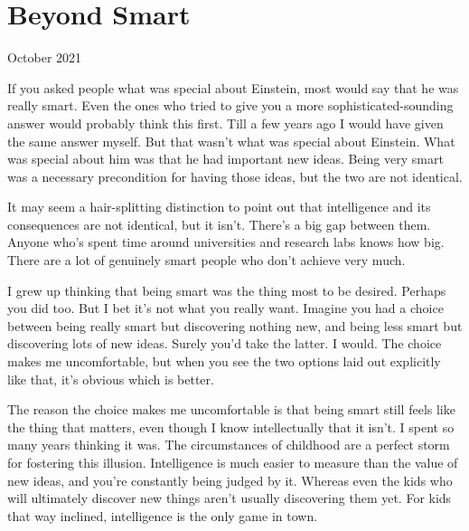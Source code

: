 \chapter{Beyond Smart}

October 2021

If you asked people what was special about Einstein, most would say that
he was really smart. Even the ones who tried to give you a more
sophisticated-sounding answer would probably think this first. Till a
few years ago I would have given the same answer myself. But that wasn't
what was special about Einstein. What was special about him was that he
had important new ideas. Being very smart was a necessary precondition
for having those ideas, but the two are not identical.

It may seem a hair-splitting distinction to point out that intelligence
and its consequences are not identical, but it isn't. There's a big gap
between them. Anyone who's spent time around universities and research
labs knows how big. There are a lot of genuinely smart people who don't
achieve very much.

I grew up thinking that being smart was the thing most to be desired.
Perhaps you did too. But I bet it's not what you really want. Imagine
you had a choice between being really smart but discovering nothing new,
and being less smart but discovering lots of new ideas. Surely you'd
take the latter. I would. The choice makes me uncomfortable, but when
you see the two options laid out explicitly like that, it's obvious
which is better.

The reason the choice makes me uncomfortable is that being smart still
feels like the thing that matters, even though I know intellectually
that it isn't. I spent so many years thinking it was. The circumstances
of childhood are a perfect storm for fostering this illusion.
Intelligence is much easier to measure than the value of new ideas, and
you're constantly being judged by it. Whereas even the kids who will
ultimately discover new things aren't usually discovering them yet. For
kids that way inclined, intelligence is the only game in town.

